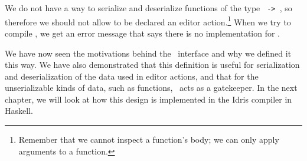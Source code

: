 We do not have a way to serialize and deserialize functions of the type
\texttt{ -> }, so therefore we should not allow 
to be declared an editor action.\footnote{Remember that we cannot inspect a
function's body; we can only apply arguments to a function.}
When we try to compile , we get an error message that says there
is no  implementation for .

We have now seen the motivations behind the \Editorable\ interface and
why we defined it this way. We have also demonstrated that this definition
is useful for serialization and deserialization of the data used in editor
actions, and that for the unserializable kinds of data, such as functions,
\Editorable\ acts as a gatekeeper. In the next chapter, we will look at how
this design is implemented in the Idris compiler in Haskell.
